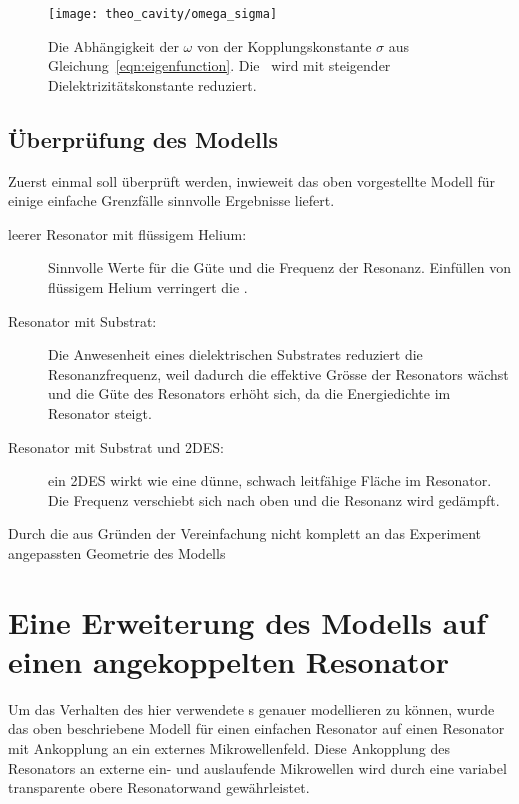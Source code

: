 \begin{figure}[h!tbp]
	\texttt{[image: theo\_cavity/omega\_sigma]}%
	\hfill
	\begin{minipage}[b]{\textwidth-\smidwidth-\tabcolsep}
		\caption[Abhängigkeit der Resonanzfrequenz]{Die Abhängigkeit der \RF $\omega$ von der Kopplungskonstante $\sigma$ aus Gleichung~\eqref{eqn:eigenfunction}. Die \RF\ wird mit steigender Dielektrizitätskonstante reduziert.}
		\label{fig:cavity_eigenfunction}
	 \end{minipage}
\end{figure}

\subsection{Überprüfung des Modells}
\label{ssec:check_model}

Zuerst einmal soll überprüft werden, inwieweit das oben vorgestellte Modell für einige einfache Grenzfälle sinnvolle Ergebnisse liefert.

\begin{description}
    \item[leerer Resonator mit flüssigem Helium:] Sinnvolle Werte für die Güte und die Frequenz der Resonanz. Einfüllen von flüssigem Helium verringert die \RF.
    \item[Resonator mit Substrat:] Die Anwesenheit eines dielektrischen Substrates reduziert die Resonanzfrequenz, weil dadurch die effektive Grösse der Resonators wächst und die Güte des Resonators erhöht sich, da die Energiedichte im Resonator steigt.
    \item[Resonator mit Substrat und 2DES:] ein 2DES wirkt wie eine dünne, schwach leitfähige Fläche im Resonator. Die Frequenz verschiebt sich nach oben und die Resonanz wird gedämpft.
\end{description}
Durch die aus Gründen der Vereinfachung nicht komplett an das Experiment angepassten Geometrie des Modells 

\section{Eine Erweiterung des Modells auf einen angekoppelten Resonator}
Um das Verhalten des hier verwendete \HR s genauer modellieren zu können, wurde das oben beschriebene Modell für einen einfachen Resonator auf einen Resonator mit Ankopplung an ein externes Mikrowellenfeld.
Diese Ankopplung des Resonators an externe ein- und auslaufende Mikrowellen wird durch eine variabel transparente obere Resonatorwand gewährleistet. 

